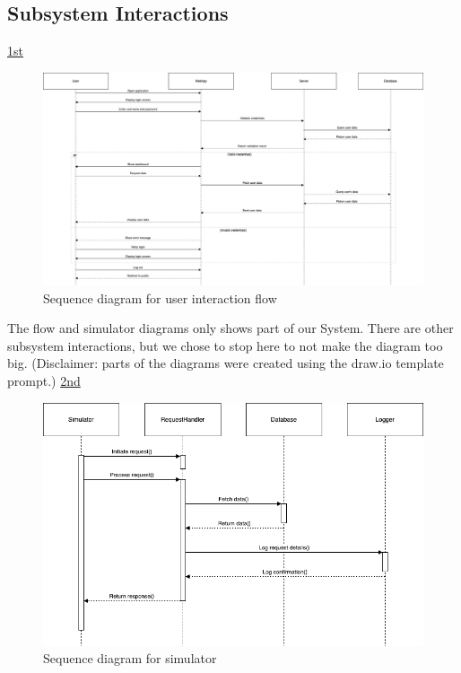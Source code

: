 \subsection{Subsystem Interactions}
\href{https://drive.google.com/file/d/18J39M3thQ0d2ehqQaVaydPF2SMUSb1fc/view?usp=sharing}{1st}
\begin{figure}[H]
  \centering
  \includegraphics[width=\textwidth]{report/images/flow.png}
  \caption{Sequence diagram for user interaction flow }
  \label{fig:interaction}
\end{figure}
The flow and simulator diagrams only shows part of our System. There are other subsystem interactions, but we chose to stop here to not make the diagram too big. (Disclaimer: parts of the diagrams were created using the draw.io template prompt.)
\href{https://drive.google.com/file/d/1UtkS9Ijj9L4FBIYaqHKRZSK_WOFRrOoa/view?usp=sharing}{2nd}
\begin{figure}[H]
  \centering
  \includegraphics[width=\textwidth]{report/images/simulator.png}
  \caption{Sequence diagram for simulator}
  \label{fig:interaction}
\end{figure}


